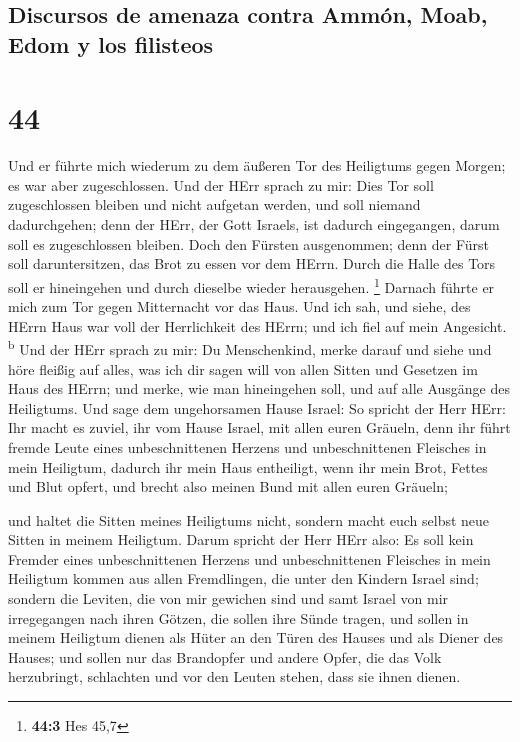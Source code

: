\hypertarget{discursos-de-amenaza-contra-ammuxf3n-moab-edom-y-los-filisteos}{%
\subsection{Discursos de amenaza contra Ammón, Moab, Edom y los
filisteos}\label{discursos-de-amenaza-contra-ammuxf3n-moab-edom-y-los-filisteos}}

\hypertarget{section-43}{%
\section{44}\label{section-43}}

 Und er führte mich wiederum zu dem äußeren Tor des
Heiligtums gegen Morgen; es war aber zugeschlossen.  Und
der HErr sprach zu mir: Dies Tor soll zugeschlossen bleiben und nicht
aufgetan werden, und soll niemand dadurchgehen; denn der HErr, der Gott
Israels, ist dadurch eingegangen, darum soll es zugeschlossen bleiben.
 Doch den Fürsten ausgenommen; denn der Fürst soll
daruntersitzen, das Brot zu essen vor dem HErrn. Durch die Halle des
Tors soll er hineingehen und durch dieselbe wieder herausgehen.
\footnote{\textbf{44:3} Hes 45,7}  Darnach führte er mich
zum Tor gegen Mitternacht vor das Haus. Und ich sah, und siehe, des
HErrn Haus war voll der Herrlichkeit des HErrn; und ich fiel auf mein
Angesicht. \textsuperscript{b}  Und der HErr sprach zu
mir: Du Menschenkind, merke darauf und siehe und höre fleißig auf alles,
was ich dir sagen will von allen Sitten und Gesetzen im Haus des HErrn;
und merke, wie man hineingehen soll, und auf alle Ausgänge des
Heiligtums.  Und sage dem ungehorsamen Hause Israel: So
spricht der Herr HErr: Ihr macht es zuviel, ihr vom Hause Israel, mit
allen euren Gräueln,  denn ihr führt fremde Leute eines
unbeschnittenen Herzens und unbeschnittenen Fleisches in mein Heiligtum,
dadurch ihr mein Haus entheiligt, wenn ihr mein Brot, Fettes und Blut
opfert, und brecht also meinen Bund mit allen euren Gräueln;

 und haltet die Sitten meines Heiligtums nicht, sondern
macht euch selbst neue Sitten in meinem Heiligtum.  Darum
spricht der Herr HErr also: Es soll kein Fremder eines unbeschnittenen
Herzens und unbeschnittenen Fleisches in mein Heiligtum kommen aus allen
Fremdlingen, die unter den Kindern Israel sind;  sondern
die Leviten, die von mir gewichen sind und samt Israel von mir
irregegangen nach ihren Götzen, die sollen ihre Sünde tragen,
 und sollen in meinem Heiligtum dienen als Hüter an den
Türen des Hauses und als Diener des Hauses; und sollen nur das
Brandopfer und andere Opfer, die das Volk herzubringt, schlachten und
vor den Leuten stehen, dass sie ihnen dienen.

